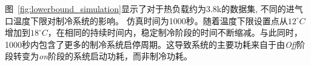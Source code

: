 图~\ref{fig:lowerbound_simulation}显示了对于热负载约为3.8k的数据集, 不同的进气口温度下限对制冷系统的影响。
仿真时间为1000秒。随着温度下限设置点从$12^{\circ}C$增加到$18^{\circ}C$，在相同的持续时间内，稳定制冷阶段的时间不断缩减。与此同时，1000秒内包含了更多的制冷系统启停周期。这导致系统的主要功耗来自于由\textit{Off}阶段转变为\textit{on}阶段的系统启动功耗，而非制冷功耗。

